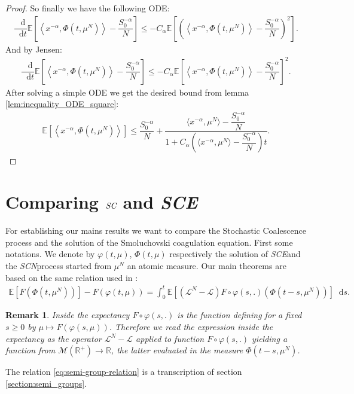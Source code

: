\documentclass[11pt,a4paper]{article}
\newcommand{\RR}{\mathbb{R}}
\newcommand{\MC}{\mathcal{M}}
\newcommand{\LC}{\mathcal{L}}
\newcommand{\E}[1]{\mathbb{E}\left[#1\right]}
\newcommand{\SC}{{\emph{SC}}}
\newcommand{\SCE}{{\emph{SCE}}}
\newcommand{\SCN}{\emph{SCN}}
\newcommand{\dd}{\mathop{}\!\mathrm{d}}
\newtheorem{remark}[theorem]{Remark}
\begin{document}
\begin{proof}
    So finally we have the following ODE:
    \begin{align*}
        \dfrac{\dd}{\dd t} \E{\left\langle x^{-\alpha},\Phi(t,\mu^N)\right\rangle- \dfrac{S_0^{-\alpha}}{N}} \leq -C_\alpha\E{\left(\left\langle x^{-\alpha},\Phi(t,\mu^N)\right\rangle - \dfrac{S_0^{-\alpha}}{N}\right)^2}.
    \end{align*}
    And by Jensen:
   \begin{align*}
        \dfrac{\dd}{\dd t} \E{\left\langle x^{-\alpha},\Phi(t,\mu^N)\right\rangle- \dfrac{S_0^{-\alpha}}{N}} \leq -C_\alpha\E{\left\langle x^{-\alpha},\Phi(t,\mu^N)\right\rangle - \dfrac{S_0^{-\alpha}}{N}}^2.
    \end{align*}
    After solving a simple ODE we get the desired bound from lemma \ref{lem:inequality_ODE_square}:
    \begin{align*}
        \E{\left\langle x^{-\alpha},\Phi(t,\mu^N)\right\rangle} \leq \dfrac{S_0^{-\alpha}}{N} + \dfrac{\langle x^{-\alpha},\mu^N \rangle - \dfrac{S_0^{-\alpha}}{N}}{1 + C_\alpha \left(\langle x^{-\alpha},\mu^N \rangle - \dfrac{S_0^{-\alpha}}{N}\right)t}.
    \end{align*}
\end{proof}


\section{Comparing $\SC$ and \SCE}
For establishing our mains results we want to compare the Stochastic Coalescence process and the solution of the Smoluchovski coagulation equation. First some notations. We denote by $\varphi(t,\mu)$, $\Phi(t,\mu)$ respectively the solution of \SCE and the \SCN process started from $\mu^N$ an atomic measure.
Our main theorems are based on the same relation used in \cite{kolokoltsov2010central}:
\begin{align}\label{eq:semi-group-relation}
\E{F(\Phi(t,\mu^N))} - F(\varphi\left(t,\mu\right)) = \int_0^t \E{\left(\LC^N - \LC\right)F\circ \varphi(s,.)\left(\Phi(t-s,\mu^N)\right)}\dd s.
\end{align}
\begin{remark}
    Inside the expectancy $F\circ \varphi(s,.)$ is the function defining for a fixed $s \geq 0$ by $\mu \mapsto F\left(\varphi(s,\mu)\right)$. Therefore we read the expression inside the expectancy as the operator $\LC^N - \LC$ applied to function $F\circ \varphi(s,.)$ yielding a function from $\MC(\RR^+) \to \RR $, the latter evaluated in the measure $\Phi(t-s,\mu^N)$.
\end{remark}
The relation \eqref{eq:semi-group-relation} is a transcription of section \ref{section:semi_groups}.
\end{document}
